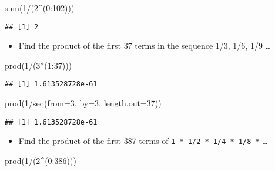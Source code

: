 \documentclass[
]{article}
\newenvironment{Shaded}{\begin{snugshade}}{\end{snugshade}}
\newcommand{\AttributeTok}[1]{\textcolor[rgb]{0.77,0.63,0.00}{#1}}
\newcommand{\DecValTok}[1]{\textcolor[rgb]{0.00,0.00,0.81}{#1}}
\newcommand{\FunctionTok}[1]{\textcolor[rgb]{0.00,0.00,0.00}{#1}}
\newcommand{\NormalTok}[1]{#1}
\newcommand{\SpecialCharTok}[1]{\textcolor[rgb]{0.00,0.00,0.00}{#1}}
\providecommand{\tightlist}{%
  \setlength{\itemsep}{0pt}\setlength{\parskip}{0pt}}
\begin{document}
\begin{Shaded}
\begin{Highlighting}[]
\FunctionTok{sum}\NormalTok{(}\DecValTok{1}\SpecialCharTok{/}\NormalTok{(}\DecValTok{2}\SpecialCharTok{\^{}}\NormalTok{(}\DecValTok{0}\SpecialCharTok{:}\DecValTok{102}\NormalTok{)))}
\end{Highlighting}
\end{Shaded}

\begin{verbatim}
## [1] 2
\end{verbatim}

\begin{itemize}
\tightlist
\item
  Find the product of the first 37 terms in the sequence 1/3, 1/6, 1/9
  \ldots{}
\end{itemize}

\begin{Shaded}
\begin{Highlighting}[]
\FunctionTok{prod}\NormalTok{(}\DecValTok{1}\SpecialCharTok{/}\NormalTok{(}\DecValTok{3}\SpecialCharTok{*}\NormalTok{(}\DecValTok{1}\SpecialCharTok{:}\DecValTok{37}\NormalTok{)))}
\end{Highlighting}
\end{Shaded}

\begin{verbatim}
## [1] 1.613528728e-61
\end{verbatim}

\begin{Shaded}
\begin{Highlighting}[]
\FunctionTok{prod}\NormalTok{(}\DecValTok{1}\SpecialCharTok{/}\FunctionTok{seq}\NormalTok{(}\AttributeTok{from=}\DecValTok{3}\NormalTok{, }\AttributeTok{by=}\DecValTok{3}\NormalTok{, }\AttributeTok{length.out=}\DecValTok{37}\NormalTok{))}
\end{Highlighting}
\end{Shaded}

\begin{verbatim}
## [1] 1.613528728e-61
\end{verbatim}

\begin{itemize}
\tightlist
\item
  Find the product of the first 387 terms of
  \texttt{1\ *\ 1/2\ *\ 1/4\ *\ 1/8\ *} \ldots{}
\end{itemize}

\begin{Shaded}
\begin{Highlighting}[]
\FunctionTok{prod}\NormalTok{(}\DecValTok{1}\SpecialCharTok{/}\NormalTok{(}\DecValTok{2}\SpecialCharTok{\^{}}\NormalTok{(}\DecValTok{0}\SpecialCharTok{:}\DecValTok{386}\NormalTok{)))}
\end{Highlighting}
\end{Shaded}
\end{document}
